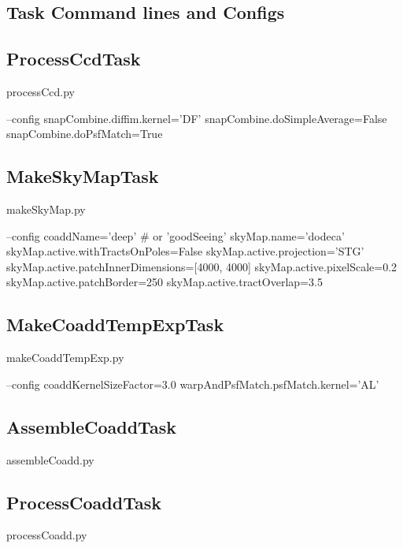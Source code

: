 \documentclass[12pt]{article}
\begin{document}

\clearpage 
\begin{appendices}
\section{Task Command lines and Configs}

\subsection{ProcessCcdTask}
\begin{python}
processCcd.py

--config
snapCombine.diffim.kernel='DF'
snapCombine.doSimpleAverage=False
snapCombine.doPsfMatch=True
\end{python}


\subsection{MakeSkyMapTask}
\begin{python}
makeSkyMap.py

--config
coaddName='deep' # or 'goodSeeing'
skyMap.name='dodeca'
skyMap.active.withTractsOnPoles=False
skyMap.active.projection='STG'
skyMap.active.patchInnerDimensions=[4000, 4000]
skyMap.active.pixelScale=0.2
skyMap.active.patchBorder=250
skyMap.active.tractOverlap=3.5
\end{python}

\subsection{MakeCoaddTempExpTask} 
\begin{python}
makeCoaddTempExp.py

--config
coaddKernelSizeFactor=3.0
warpAndPsfMatch.psfMatch.kernel='AL'
\end{python}

\subsection{AssembleCoaddTask} 
\begin{python}
assembleCoadd.py
\end{python}

\subsection{ProcessCoaddTask} 
\begin{python}
processCoadd.py
\end{python}


\end{appendices}
\end{document}
